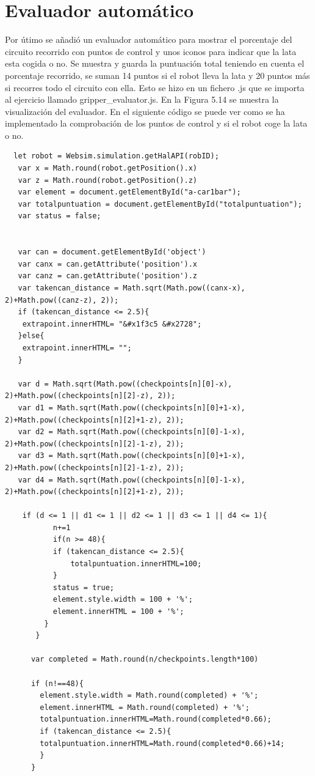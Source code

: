 \section{Evaluador automático}

Por útimo se añadió un evaluador automático para mostrar el porcentaje del circuito recorrido con puntos de control y unos iconos para indicar que la lata esta cogida o no. Se muestra y guarda la puntuación total teniendo en cuenta el porcentaje recorrido, se suman 14 puntos si el robot lleva la lata y 20 puntos más si recorres todo el circuito con ella. Esto se hizo en un fichero .js que se importa al ejercicio llamado gripper\_evaluator.js. En la Figura 5.14 se muestra la visualización del evaluador. En el siguiente código se puede ver como se ha implementado la comprobación de los puntos de control y si el robot coge la lata o no.

\begin{lstlisting}
  let robot = Websim.simulation.getHalAPI(robID);
   var x = Math.round(robot.getPosition().x)
   var z = Math.round(robot.getPosition().z)
   var element = document.getElementById("a-car1bar");
   var totalpuntuation = document.getElementById("totalpuntuation");
   var status = false;


   var can = document.getElementById('object')
   var canx = can.getAttribute('position').x
   var canz = can.getAttribute('position').z
   var takencan_distance = Math.sqrt(Math.pow((canx-x), 2)+Math.pow((canz-z), 2));
   if (takencan_distance <= 2.5){
    extrapoint.innerHTML= "&#x1f3c5 &#x2728";
   }else{
    extrapoint.innerHTML= "";
   }
   
   var d = Math.sqrt(Math.pow((checkpoints[n][0]-x), 2)+Math.pow((checkpoints[n][2]-z), 2));
   var d1 = Math.sqrt(Math.pow((checkpoints[n][0]+1-x), 2)+Math.pow((checkpoints[n][2]+1-z), 2));
   var d2 = Math.sqrt(Math.pow((checkpoints[n][0]-1-x), 2)+Math.pow((checkpoints[n][2]-1-z), 2));
   var d3 = Math.sqrt(Math.pow((checkpoints[n][0]+1-x), 2)+Math.pow((checkpoints[n][2]-1-z), 2));
   var d4 = Math.sqrt(Math.pow((checkpoints[n][0]-1-x), 2)+Math.pow((checkpoints[n][2]+1-z), 2));
	
	if (d <= 1 || d1 <= 1 || d2 <= 1 || d3 <= 1 || d4 <= 1){
	       n+=1
	       if(n >= 48){
		   if (takencan_distance <= 2.5){
		       totalpuntuation.innerHTML=100;
		   }
		   status = true;
		   element.style.width = 100 + '%';
		   element.innerHTML = 100 + '%';
	     }
	   }
	  
	  var completed = Math.round(n/checkpoints.length*100)
	  
	  if (n!==48){
	    element.style.width = Math.round(completed) + '%';
	    element.innerHTML = Math.round(completed) + '%';
	    totalpuntuation.innerHTML=Math.round(completed*0.66);
	    if (takencan_distance <= 2.5){
		totalpuntuation.innerHTML=Math.round(completed*0.66)+14;
	    }
	  }
    
\end{lstlisting}

